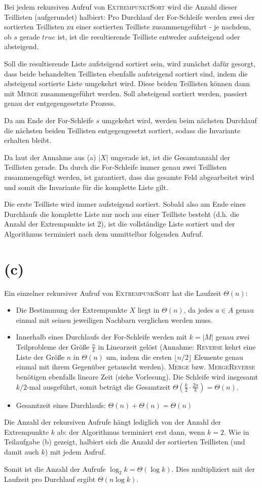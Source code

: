 \documentclass[a4paper,12pt]{article}
\begin{document}
Bei jedem rekursiven Aufruf von \textsc{ExtrempunktSort} wird die Anzahl dieser Teillisten (aufgerundet) halbiert: Pro Durchlauf der For-Schleife werden zwei der sortierten Teillisten zu einer sortierten Teilliste zusammengeführt - je nachdem, ob $s$ gerade $true$ ist, ist die resultierende Teilliste entweder aufsteigend oder absteigend. 

Soll die resultierende Liste aufsteigend sortiert sein, wird zunächst dafür gesorgt, dass beide behandelten Teillisten ebenfalls aufsteigend sortiert sind, indem die absteigend sortierte Liste umgekehrt wird. Diese beiden Teillisten können dann mit \textsc{Merge} zusammengeführt werden.
Soll absteigend sortiert werden, passiert genau der entgegengesetzte Prozess.

Da am Ende der For-Schleife $s$ umgekehrt wird, werden beim nächsten Durchlauf die nächsten beiden Teillisten entgegengesetzt sortiert, sodass die Invariante erhalten bleibt.

Da laut der Annahme aus (a) $|X|$ ungerade ist, ist die Gesamtanzahl der Teillisten gerade. Da durch die For-Schleife immer genau zwei Teillisten zusammengefügt werden, ist garantiert, dass das gesamte Feld abgearbeitet wird und somit die Invariante für die komplette Liste gilt.

Die erste Teilliste wird immer aufsteigend sortiert. Sobald also am Ende eines Durchlaufs die komplette Liste nur noch aus einer Teilliste besteht (d.h. die Anzahl der Extrempunkte ist 2), ist die vollständige Liste sortiert und der Algorithmus terminiert nach dem unmittelbar folgenden Aufruf.

\section*{(c)}
Ein einzelner rekursiver Aufruf von \textsc{ExtrempunkSort} hat die Laufzeit $\Theta(n)$: 
\begin{itemize}
\item Die Bestimmung der Extrempunkte $X$ liegt in $\Theta(n)$, da jedes $a \in A$ genau einmal mit seinen jeweiligen Nachbarn verglichen werden muss.
\item Innerhalb eines Durchlaufs der For-Schleife werden mit $k=|M|$ genau zwei Teilprobleme der Größe $\frac{n}{k}$ in Linearzeit gelöst (Annahme: \textsc{Reverse} kehrt eine Liste der Größe $n$ in $\Theta(n)$ um, indem die ersten $\lfloor n/2\rfloor$ Elemente genau einmal mit ihrem Gegenüber getauscht werden). \textsc{Merge} bzw. \textsc{MergeReverse} benötigen ebenfalls lineare Zeit (siehe Vorlesung). Die Schleife wird insgesamt $k/2$-mal ausgeführt, somit beträgt die Gesamtzeit $\Theta(\frac{k}{2}\cdot\frac{2n}{k})=\Theta(n)$.
\item Gesamtzeit eines Durchlaufs: $\Theta(n)+\Theta(n)=\Theta(n)$
\end{itemize}

Die Anzahl der rekursiven Aufrufe hängt lediglich von der Anzahl der Extrempunkte $k$ ab: der Algorithmus terminiert erst dann, wenn $k=2$. Wie in Teilaufgabe (b) gezeigt, halbiert sich die Anzahl der sortierten Teillisten (und damit auch $k$) mit jedem Aufruf. 

Somit ist die Anzahl der Aufrufe $\log_2k=\Theta(\log k)$. Dies multipliziert mit der Laufzeit pro Durchlauf ergibt $\Theta(n\log k)$.
\end{document}
